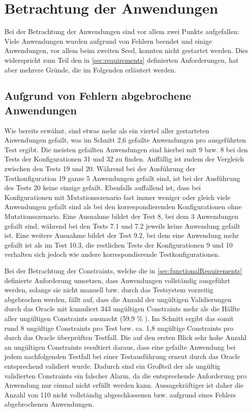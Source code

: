 \section{Betrachtung der Anwendungen}
\label{sec:appEval}

Bei der Betrachtung der Anwendungen sind vor allem zwei Punkte aufgefallen:
Viele Anwendungen wurden aufgrund von Fehlern beendet und einige Anwendungen, vor allem beim zweiten Seed, konnten nicht gestartet werden.
Dies widerspricht zum Teil den in \autoref{sec:requirements} definierten Anforderungen, hat aber mehrere Gründe, die im Folgenden erläutert werden.

\subsection{Aufgrund von Fehlern abgebrochene Anwendungen}
\label{sec:failedApps}

Wie bereits erwähnt, sind etwas mehr als ein viertel aller gestarteten Anwendungen gefailt, was im Schnitt 2,6 gefailte Anwendungen pro ausgeführten Test ergibt.
Die meisten gefailten Anwendungen sind hierbei mit 9 bzw. 8 bei den Tests der Konfigurationen 31 und 32 zu finden.
Auffällig ist zudem der Vergleich zwischen den Tests 19 und 20.
Während bei der Ausführung der Testkonfiguration 19 ganze 5 Anwendungen gefailt sind, ist bei der Ausführung des Tests 20 keine einzige gefailt.
Ebenfalls auffallend ist, dass bei Konfigurationen mit Mutationsszenario fast immer weniger oder gleich viele Anwendungen gefailt sind als bei den korrespondierenden Konfigurationen ohne Mutationsszenario.
Eine Ausnahme bildet der Test 8, bei dem 3 Anwendungen gefailt sind, während bei den Tests 7.1 und 7.2 jeweils keine Anwendung gefailt ist.
Eine weitere Ausnahme bildet der Test 9.2, bei dem eine Anwendung mehr gefailt ist als im Test 10.3, die restlichen Tests der Konfigurationen 9 und 10 verhalten sich jedoch wie andere korrespondierende Testkonfigurationen.

Bei der Betrachtung der Constraints, welche die in \autoref{sec:functionalRequirements} definierte Anforderung umsetzen, dass Anwendungen vollständig ausgeführt werden, solange sie nicht manuell bzw. durch das Testsystem vorzeitig abgebrochen werden, fällt auf, dass die Anzahl der ungültigen Validierungen durch das Oracle mit kumuliert 343 ungültigen Constraints mehr als die Hälfte aller ungültigen Constraints ausmacht (59,9 \% ).
Im Schnitt ergibt das somit rund 8 ungültige Constraints pro Test bzw. ca. 1,8 ungültige Constraints pro durch das Oracle überprüften Testfall.
Die auf den ersten Blick sehr hohe Anzahl an ungültigen Constraints resultiert daraus, dass eine gefailte Anwendung bei jedem nachfolgenden Testfall bei einer Testausführung erneut durch das Oracle entsprechend validiert wurde.
Dadurch sind ein Großteil der als ungültig validierten Constraints ein falscher Alarm, da die entsprechende Anforderung pro Anwendung nur einmal nicht erfüllt werden kann.
Aussagekräftiger ist daher die Anzahl von 110 nicht vollständig abgeschlossenen bzw. aufgrund eines Fehlers abgebrochenen Anwendungen.

